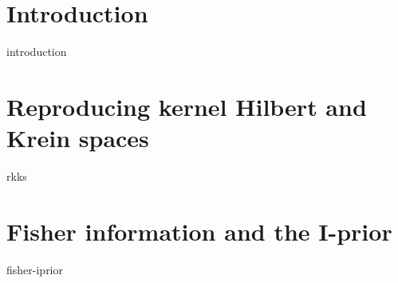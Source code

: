 \documentclass[a4paper,11pt,showframe]{report}
\begin{document}
\chapter{Introduction} 
{introduction}

\chapter{Reproducing kernel Hilbert and Krein spaces}
{rkks}

\chapter{Fisher information and the I-prior}
{fisher-iprior}

%
%
%
%
%
%
%
\end{document}
